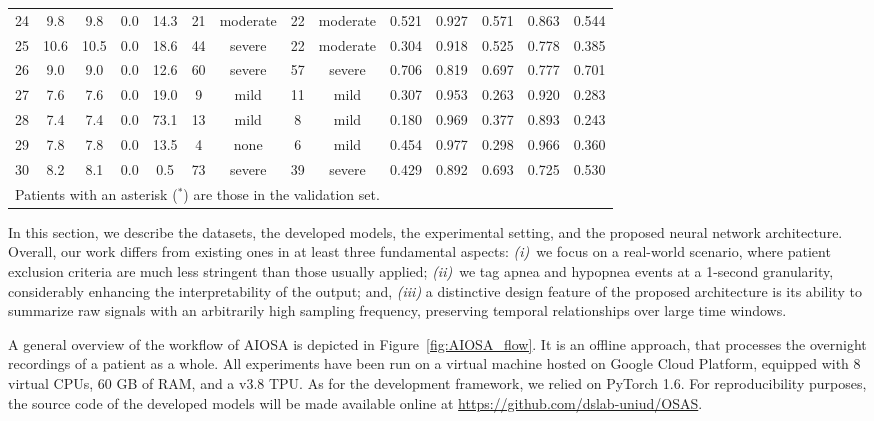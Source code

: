 \documentclass[5p,twocolumn,lefttitle]{elsarticle}
\begin{document}
\begin{table*}[tb]
{\begin{tabular}{c|cccccc|ccccccc}
24     & 9.8  & 9.8 & 0.0 & 14.3 & 21 & moderate & 22 & moderate & 0.521 & 0.927 & 0.571 & 0.863 & 0.544 \\
25     & 10.6 & 10.5 & 0.0 & 18.6 & 44 & severe   & 22 & moderate & 0.304 & 0.918 & 0.525 & 0.778 & 0.385 \\
26     & 9.0  & 9.0 & 0.0 & 12.6 & 60 & severe   & 57 & severe   & 0.706 & 0.819 & 0.697 & 0.777 & 0.701 \\
27     & 7.6  & 7.6 & 0.0 & 19.0 & 9  & mild     & 11 & mild     & 0.307 & 0.953 & 0.263 & 0.920 & 0.283 \\
28     & 7.4  & 7.4 & 0.0 & 73.1 & 13 & mild     & 8  & mild     & 0.180 & 0.969 & 0.377 & 0.893 & 0.243 \\
29     & 7.8  & 7.8 & 0.0 & 13.5 & 4  & none     & 6  & mild     & 0.454 & 0.977 & 0.298 & 0.966 & 0.360 \\
30     & 8.2  & 8.1 & 0.0 & 0.5 & 73 & severe   & 39 & severe   & 0.429 & 0.892 & 0.693 & 0.725 & 0.530 \\
\bottomrule
\multicolumn{13}{l}{\small Patients with an asterisk ($^*$) are those in the validation set.}
\end{tabular}
}
\end{table*}

In this section, we describe the datasets, the developed models,  the experimental setting, and the proposed neural network architecture. 
Overall, our work differs from existing ones in at least three fundamental aspects: \emph{(i)}~we focus on a real-world scenario, where patient exclusion criteria are much less stringent than those usually applied; \emph{(ii)}~we tag apnea and hypopnea events at a 1-second granularity, considerably enhancing the interpretability of the output; and, \emph{(iii)} a distinctive design feature of the proposed architecture is its ability to summarize raw signals with an arbitrarily high sampling frequency, preserving temporal relationships over large time windows. 

A general overview of the workflow of AIOSA is depicted in Figure~\ref{fig:AIOSA_flow}. It is an offline approach, that processes the overnight recordings of a patient as a whole. All experiments have been run on a virtual machine hosted on Google Cloud Platform, equipped with 8 virtual CPUs, 60 GB of RAM, and a v3.8 TPU. As for the development framework, we relied on PyTorch 1.6. For reproducibility purposes, the source code of the developed models will be made available online at \url{https://github.com/dslab-uniud/OSAS}.
\end{document}

